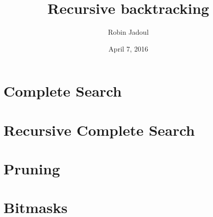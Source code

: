 \documentclass{beamer}
\title{Recursive backtracking}
\author{Robin Jadoul}
\date{April 7, 2016}
\institute
{
    \texttt{[image: ../shared-img/beoi-logo.png]}
}
\begin{document}
\frame{\titlepage}

\section[Complete Search]{Complete Search}


\section[Recursive Complete Search]{Recursive Complete Search}


\section[Pruning]{Pruning}


\section[Bitmasks]{Bitmasks}

\end{document}
